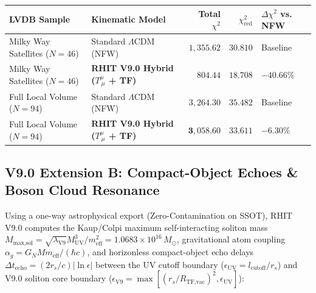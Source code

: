 \documentclass[11pt, a4paper]{article}
\begin{document}
\begin{center}
{\small
\setlength{\tabcolsep}{5pt}
\begin{tabular}{p{4.6cm} p{4.2cm} r r p{2.8cm}}
\toprule
\textbf{LVDB Sample} & \textbf{Kinematic Model} & \textbf{Total $\chi^2$} & \textbf{$\chi^2_{\text{red}}$} & \textbf{$\Delta\chi^2$ vs. NFW} \\
\midrule
Milky Way Satellites ($N = 46$) & Standard $\Lambda\text{CDM}$ (NFW) & $1,355.62$ & $30.810$ & Baseline \\
\rowcolor{rowtint}
Milky Way Satellites ($N = 46$) & \textbf{RHIT V9.0 Hybrid ($T^\mu_{\ \mu}$ + TF)} & $\mathbf{804.44}$ & $\mathbf{18.708}$ & $\mathbf{-40.66\%}$ \\
\midrule
Full Local Volume ($N = 94$) & Standard $\Lambda\text{CDM}$ (NFW) & $3,264.30$ & $35.482$ & Baseline \\
\rowcolor{rowtint}
Full Local Volume ($N = 94$) & \textbf{RHIT V9.0 Hybrid ($T^\mu_{\ \mu}$ + TF)} & $\mathbf{3,058.60}$ & $\mathbf{33.611}$ & $\mathbf{-6.30\%}$ \\
\bottomrule
\end{tabular}
}
\end{center}

\subsection{V9.0 Extension B: Compact-Object Echoes \& Boson Cloud Resonance}

Using a one-way astrophysical export (Zero-Contamination on SSOT), RHIT V9.0 computes the Kaup/Colpi maximum self-interacting soliton mass $M_{\text{max,sol}} = \sqrt{\lambda_{\text{V9}}} M_{\text{UV}}^3 / m_{\text{eff}}^2 = 1.0683 \times 10^{16}\,M_\odot$, gravitational atom coupling $\alpha_g = G_N M m_{\text{eff}} / (\hbar c)$, and horizonless compact-object echo delays $\Delta t_{\text{echo}} = (2 r_s / c)|\ln \epsilon|$ between the UV cutoff boundary ($\epsilon_{\text{UV}} = l_{\text{cutoff}}/r_s$) and V9.0 soliton core boundary ($\epsilon_{\text{V9}} = \max[(r_s/R_{\text{TF,vac}})^2, \epsilon_{\text{UV}}]$):
\end{document}
